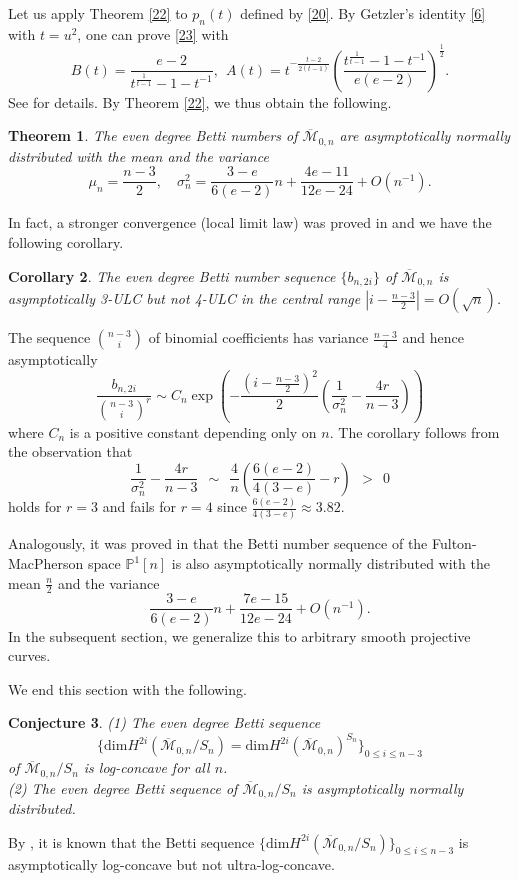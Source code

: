 \documentclass[11pt,letterpaper]{amsart}
\numberwithin{equation}{section}
\newtheorem{theorem}{Theorem}[section]
\newtheorem{corollary}[theorem]{Corollary}
\newtheorem{conjecture}[theorem]{Conjecture}
\theoremstyle{definition}
\newcommand{\PP}{\mathbb{P}}
\newcommand{\cal}{\mathcal}
\def\cM{{\cal M}}
\def\mzn{\overline{\cM}_{0,n} }
\def\dim{\mathrm{dim} }
\def\beq{\begin{equation}}
\def\eeq{\end{equation}}
\begin{document}
Let us apply Theorem \ref{22} to $p_n(t)$ defined by \eqref{20}.
By Getzler's identity \eqref{6} with $t=u^2$, one can prove \eqref{23} with
\beq\label{24}
B(t)=\frac{e-2}{t^{\frac{1}{t-1}}-1-t^{-1}}, \ \ A(t)=t^{-\frac{t-2}{2(t-1)}}\left(\frac{t^{\frac{1}{t-1}}-1-t^{-1}}{e(e-2)} \right)^{\frac12}.
\eeq
See \cite[\S3]{CK} for details. By Theorem \ref{22}, we thus obtain the following.
\begin{theorem}\label{25} \cite[Theorem 3.1]{CK}
    The even degree Betti numbers of $\mzn$ are asymptotically normally distributed with the mean and the variance
    $$\mu_n=\frac{n-3}{2}, \quad \sigma_n^2=\frac{3-e}{6(e-2)} n+\frac{4e-11}{12e-24}+O(n^{-1}).$$
\end{theorem}
In fact, a stronger convergence (local limit law) was proved in \cite{CK} and we have the following corollary.
\begin{corollary}\label{cor:ULC}
    The even degree Betti number sequence $\{b_{n,2i}\}$ of $\mzn$ is asymptotically 3-ULC but not 4-ULC in the central range $|i-\frac{n-3}{2}|=O(\sqrt{n})$.
\end{corollary}
The sequence $\binom{n-3}{i}$ of binomial coefficients has variance $\frac{n-3}{4}$ and hence asymptotically
$$\frac{b_{n,2i}}{\binom{n-3}{i}^r}\sim C_n\exp\left( -\frac{(i-\frac{n-3}{2})^2}{2}\left(\frac{1}{\sigma_n^2}-\frac{4r}{n-3} \right) \right)$$
where $C_n$ is a positive constant depending only on $n$.
The corollary follows from the observation that
$$\frac{1}{\sigma_n^2}-\frac{4r}{n-3}\ \ \sim\ \  \frac{4}{n}\left(\frac{6(e-2)}{4(3-e)}-r\right)\ \ >\ \ 0$$
holds for $r=3$ and fails for $r=4$ since $\frac{6(e-2)}{4(3-e)} \approx 3.82$.

Analogously, it was proved in \cite[\S4]{CK} that
the Betti number sequence of the Fulton-MacPherson space $\PP^1[n]$ is also asymptotically normally distributed with the mean $\frac{n}{2}$ and the variance
$$\frac{3-e}{6(e-2)} n+\frac{7e-15}{12e-24}+O(n^{-1}). $$
In the subsequent section, we generalize this to arbitrary smooth projective curves.

We end this section with the following.
\begin{conjecture}
    (1) The even degree Betti sequence $$\{\dim H^{2i}(\mzn/S_n)=\dim H^{2i}(\mzn)^{S_n}\}_{0\le i\le n-3}$$ of $\mzn/S_n$ is log-concave for all $n$.\\
    (2) The even degree Betti sequence of $\mzn/S_n$ is asymptotically normally distributed.
\end{conjecture}
By \cite{CKL2}, it is known that the Betti sequence $\{\dim H^{2i}(\mzn/S_n)\}_{0\le i\le n-3}$ is asymptotically log-concave but not ultra-log-concave.
\end{document}
